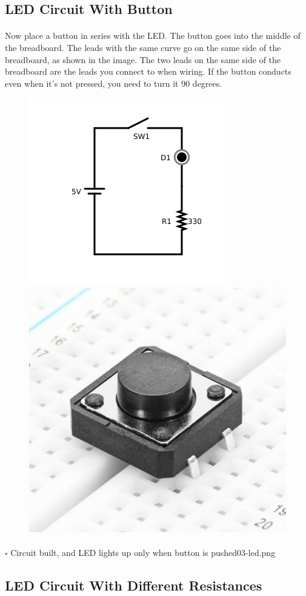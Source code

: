\documentclass{article}
\begin{document}
\subsection{LED Circuit With Button}
\paragraph{}
Now place a button in series with the LED. The button goes into the middle of the breadboard. The leads with the same curve go on the same side of the breadboard, as shown in the image. The two leads on the same side of the breadboard are the leads you connect to when wiring. If the button conducts even when it's not pressed, you need to turn it 90 degrees.
\begin{figure}[H]
  \centering
  \includegraphics[width=0.4\linewidth]{pngs/04-led-button.png}
  \includegraphics[width=0.4\linewidth]{pngs/button.png}
\end{figure}
\paragraph{}
$\square$ Circuit built, and LED lights up only when button is pushed03-led.png

\newpage
\subsection{LED Circuit With Different Resistances}
\end{document}

